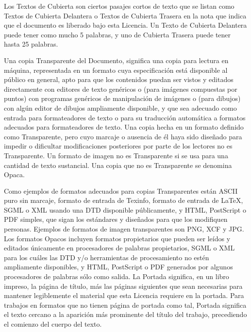 \documentclass[letterpaper,12pt,titlepage]{article}
\begin{document}
Los Textos de Cubierta son ciertos pasajes cortos de texto que se listan como Textos de Cubierta Delantera o Textos de Cubierta Trasera en la nota que indica que el documento es liberado bajo esta Licencia. Un Texto de Cubierta Delantera puede tener como mucho 5 palabras, y uno de Cubierta Trasera puede tener hasta 25 palabras.\par

Una copia Transparente del Documento, significa una copia para lectura en máquina, representada en un formato cuya especificación está disponible al público en general, apto para que los contenidos puedan ser vistos y editados directamente con editores de texto genéricos o (para imágenes compuestas por puntos) con programas genéricos de manipulación de imágenes o (para dibujos) con algún editor de dibujos ampliamente disponible, y que sea adecuado como entrada para formateadores de texto o para su traducción automática a formatos adecuados para formateadores de texto. Una copia hecha en un formato definido como Transparente, pero cuyo marcaje o ausencia de él haya sido diseñado para impedir o dificultar modificaciones posteriores por parte de los lectores no es Transparente. Un formato de imagen no es Transparente si se usa para una cantidad de texto sustancial. Una copia que no es Transparente se denomina Opaca.\par

Como ejemplos de formatos adecuados para copias Transparentes están ASCII puro sin marcaje, formato de entrada de Texinfo, formato de entrada de LaTeX, SGML o XML usando una DTD disponible públicamente, y HTML, PostScript o PDF simples, que sigan los estándares y diseñados para que los modifiquen personas. Ejemplos de formatos de imagen transparentes son PNG, XCF y JPG. Los formatos Opacos incluyen formatos propietarios que pueden ser leídos y editados únicamente en procesadores de palabras propietarios, SGML o XML para los cuáles las DTD y/o herramientas de procesamiento no estén ampliamente disponibles, y HTML, PostScript o PDF generados por algunos procesadores de palabras sólo como salida.
La Portada significa, en un libro impreso, la página de título, más las páginas siguientes que sean necesarias para mantener legiblemente el material que esta Licencia requiere en la portada. Para trabajos en formatos que no tienen página de portada como tal, Portada significa el texto cercano a la aparición más prominente del título del trabajo, precediendo el comienzo del cuerpo del texto.\par
\end{document}
